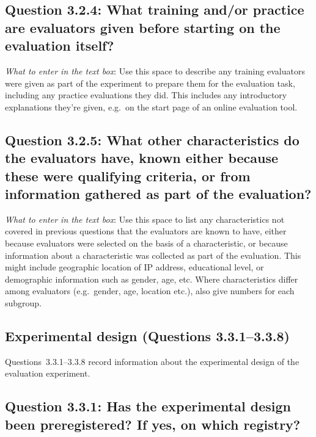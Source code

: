 \documentclass[11pt,a4paper]{article}
\begin{document}
\vspace{-.3cm}
\subsection*{Question 3.2.4: What training and/or practice are evaluators given before starting on the evaluation itself?}

\noindent\textit{What to enter in the text box}: Use this space to describe any training evaluators were given as part of the experiment to prepare them for the evaluation task, including any practice evaluations they did. This includes any introductory explanations they're given, e.g.\ on the start page of an online evaluation tool.

\vspace{-.3cm}
\subsection*{Question 3.2.5:  What other characteristics do the evaluators have, known either because these were qualifying criteria, or from information gathered as part of the evaluation?}

\noindent\textit{What to enter in the text box}: Use this space to list any characteristics not covered in previous questions that the evaluators are known to have, either because evaluators were selected on the basis of a characteristic, or because information about a characteristic was collected as part of the evaluation. This might include geographic location of IP address, educational level, or demographic information such as gender, age, etc. Where characteristics differ among evaluators (e.g.\ gender, age, location etc.), also give numbers for each subgroup.


\subsection{Experimental design (Questions 3.3.1--3.3.8)}

Questions~3.3.1--3.3.8 record information about the experimental design of the evaluation experiment.

\vspace{-.3cm}
\subsection*{Question 3.3.1:  Has the experimental design been preregistered? If yes, on which registry?}
\end{document}
